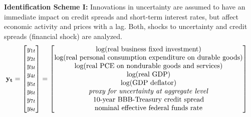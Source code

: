 \documentclass[a4paper,11pt,listof=nochaptergap,oneside,pointednumbers,bibtotoc,bigheadings,liststotoc,hidelinks]{scrbook}
\theoremstyle{mysatz}
\theoremstyle{mydefinition}
\theoremstyle{mytheorem}
\theoremstyle{mybemerkung}
\newcommand{\vect}[1]{\boldsymbol{\mathbf{#1}}}
\begin{document}
\textbf{Identification Scheme I:}
Innovations in uncertainty are assumed to have an immediate impact on credit spreads and short-term interest rates, but affect economic activity and prices with a lag. Both, shocks to uncertainty and credit spreads (financial shock) are analyzed.
\begin{equation} \label{eq:VAR20}
\begin{split}
\vect{y_t} & = 
 \begin{bmatrix} 
 		y_{1t} \\
		y_{2t} \\
		y_{3t} \\
		y_{4t} \\
		y_{5t} \\
		y_{6t} \\
		y_{7t} \\
		y_{8t} 
	      \end{bmatrix} = 	      
	      \begin{bmatrix} \text{log(real business fixed investment)} \\ 
				      \text{log(real personal consumption expenditure on durable goods)}\\ 
				      \text{log(real PCE on nondurable goods and services)}\\
				      \text{log(real GDP)}\\ 
				      \text{log(GDP deflator)}\\
				      \text{\textit{proxy for uncertainty at aggregate level}}\\
				      \text{10-year BBB-Treasury credit spread}\\
				      \text{nominal effective federal funds rate}
	      \end{bmatrix}
\end{split}
\end{equation}	
\end{document}
